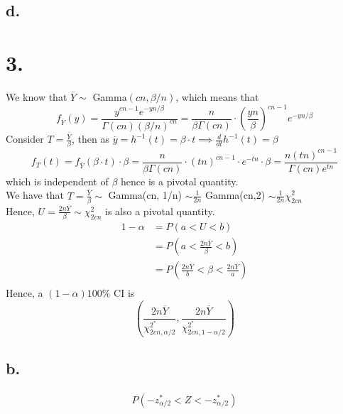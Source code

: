 \documentclass[11pt]{article}
\begin{document}
\subsection*{d.}
\pagebreak
\section*{3.}
We know that $\overline{Y} \sim $ Gamma$(cn, \beta/n )$, which means that 
\[
    f_{\overline{Y}}(y) = \frac{y^{cn-1} e^{-yn/\beta}}{\Gamma(cn) {(\beta/n)^{cn}}} = \frac{n}{\beta \Gamma(cn)} \cdot \left(\frac{yn}{\beta} \right)^{cn-1} e^{-yn/\beta}
\]
Consider $T = \frac{\overline{Y}}{\beta}$, then as $\overline{y} = h^{-1}(t) = \beta \cdot t \implies \frac{d}{dt} h^{-1}(t) = \beta$
\[
    f_T(t) =  f_{\overline{Y}}(\beta \cdot t) \cdot \beta = \frac{n}{\beta \Gamma(cn)} \cdot (tn)^{cn-1} \cdot e^{-tn} \cdot \beta = \frac{n (tn)^{cn-1}}{\Gamma(cn) e^{tn}}
\]
which is independent of $\beta$ hence is a pivotal quantity. \\
We have that $T = \frac{\overline{Y}}{\beta} \sim $ Gamma(cn, 1/n) $\sim \frac{1}{2n}$ Gamma(cn,2) $\sim \frac{1}{2n}\chi_{2cn}^2$ \\
Hence, $U = \frac{2n \overline{Y}}{\beta} \sim \chi_{2cn}^2$ is also a pivotal quantity. \\
\begin{equation*}
    \begin{aligned}
        1- \alpha &= P(a<U<b) \\
        &= P(a < \frac{2n \overline{Y}}{\beta} < b) \\
        &= P\left(\frac{2n\overline{Y}}{b} < \beta < \frac{2n\overline{Y}}{a}\right) \\
    \end{aligned}
\end{equation*}
Hence, a $(1-\alpha)100\%$ CI is 
\[
    \left(\frac{2n \overline{Y}}{\chi_{2cn,\alpha/2}^{2^\ast}}, \frac{2n \overline{Y}}{\chi_{2cn,1-\alpha/2}^{2^\ast}} \right)
\]
\subsection*{b.}
\begin{equation*}
    \begin{aligned}
        P(-z_{\alpha/2}^\ast < Z < -z_{\alpha/2}^\ast)
    \end{aligned}
\end{equation*}
\end{document}
